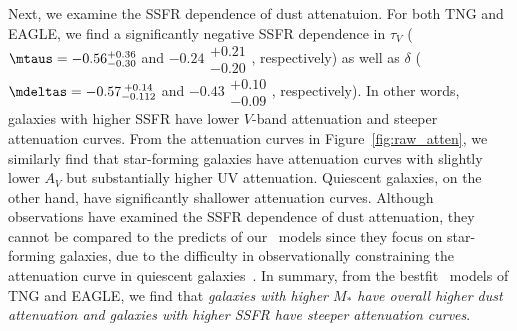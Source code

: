 Next, we examine the SSFR dependence of dust attenatuion. For both TNG and
EAGLE, we find a significantly negative SSFR dependence in $\tau_V$ 
($\mtaus = -0.56\substack{+0.36 \\ -0.30}$ and
$-0.24\substack{+0.21 \\ -0.20}$, respectively) as well as $\delta$ 
($\mdeltas = -0.57\substack{+0.14 \\ -0.112}$ and $-0.43\substack{+0.10 \\ -0.09}$,
respectively). In other words, galaxies with higher SSFR have lower $V$-band
attenuation and steeper attenuation curves. From the attenuation curves in
Figure~\ref{fig:raw_atten}, we similarly find that star-forming galaxies have
attenuation curves with slightly lower $A_V$ but substantially higher UV 
attenuation. Quiescent galaxies, on the other hand, have significantly 
shallower attenuation curves. Although observations have examined the
SSFR dependence of dust attenuation, they cannot be compared to the predicts of
our \eda~models since they focus on star-forming galaxies, due to the
difficulty in observationally constraining the attenuation curve in quiescent
galaxies~\citep[\eg][]{garn2010, reddy2015, battisti2016, battisti2017, salim2018}. 
In summary, from the bestfit \eda~models of TNG and EAGLE, we find that
\emph{galaxies with higher $M_*$ have overall higher dust attenuation and
galaxies with higher SSFR have steeper attenuation curves}.
